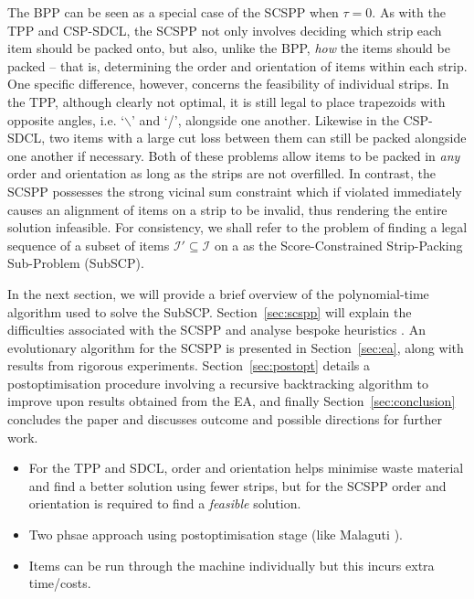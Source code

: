 \documentclass{elsarticle}
\begin{document}
\noindent The BPP can be seen as a special case of the SCSPP when $\tau = 0$. As with the TPP and CSP-SDCL, the SCSPP not only involves deciding which strip each item should be packed onto, but also, unlike the BPP, \emph{how} the items should be packed -- that is, determining the order and orientation of items within each strip. One specific difference, however, concerns the feasibility of individual strips. In the TPP, although clearly not optimal, it is still legal to place trapezoids with opposite angles, i.e. `$\backslash$' and `/', alongside one another. Likewise in the CSP-SDCL, two items with a large cut loss between them can still be packed alongside one another if necessary. Both of these problems allow items to be packed in \emph{any} order and orientation as long as the strips are not overfilled. In contrast, the SCSPP possesses the strong vicinal sum constraint which if violated immediately causes an alignment of items on a strip to be invalid, thus rendering the entire solution infeasible. For consistency, we shall refer to the  problem of finding a legal sequence of a subset of items $\mathcal{I}' \subseteq \mathcal{I}$ on a  as the Score-Constrained Strip-Packing Sub-Problem (SubSCP).

In the next section, we will provide a brief overview of the polynomial-time algorithm used to solve the SubSCP. Section~\ref{sec:scspp} will explain the difficulties associated with the SCSPP and analyse bespoke heuristics . An evolutionary algorithm for the SCSPP is presented in Section~\ref{sec:ea}, along with results from rigorous experiments. Section~\ref{sec:postopt} details a postoptimisation procedure involving a recursive backtracking algorithm to improve upon results obtained from the EA, and finally Section~\ref{sec:conclusion} concludes the paper and discusses outcome and possible directions for further work.

{\color{myOrange}
\begin{itemize}[leftmargin=*]
	\item For the TPP and SDCL, order and orientation helps minimise waste material and find a better solution using fewer strips, but for the SCSPP order and orientation is required to find a \emph{feasible} solution.
	\item Two phsae approach using postoptimisation stage (like Malaguti \cite{malaguti2008}).
	\item Items can be run through the machine individually but this incurs extra time/costs.
\end{itemize}
}
\end{document}
